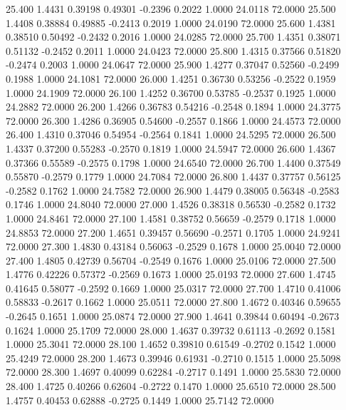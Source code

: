   25.400   1.4431   0.39198   0.49301  -0.2396   0.2022   1.0000  24.0118  72.0000
  25.500   1.4408   0.38884   0.49885  -0.2413   0.2019   1.0000  24.0190  72.0000
  25.600   1.4381   0.38510   0.50492  -0.2432   0.2016   1.0000  24.0285  72.0000
  25.700   1.4351   0.38071   0.51132  -0.2452   0.2011   1.0000  24.0423  72.0000
  25.800   1.4315   0.37566   0.51820  -0.2474   0.2003   1.0000  24.0647  72.0000
  25.900   1.4277   0.37047   0.52560  -0.2499   0.1988   1.0000  24.1081  72.0000
  26.000   1.4251   0.36730   0.53256  -0.2522   0.1959   1.0000  24.1909  72.0000
  26.100   1.4252   0.36700   0.53785  -0.2537   0.1925   1.0000  24.2882  72.0000
  26.200   1.4266   0.36783   0.54216  -0.2548   0.1894   1.0000  24.3775  72.0000
  26.300   1.4286   0.36905   0.54600  -0.2557   0.1866   1.0000  24.4573  72.0000
  26.400   1.4310   0.37046   0.54954  -0.2564   0.1841   1.0000  24.5295  72.0000
  26.500   1.4337   0.37200   0.55283  -0.2570   0.1819   1.0000  24.5947  72.0000
  26.600   1.4367   0.37366   0.55589  -0.2575   0.1798   1.0000  24.6540  72.0000
  26.700   1.4400   0.37549   0.55870  -0.2579   0.1779   1.0000  24.7084  72.0000
  26.800   1.4437   0.37757   0.56125  -0.2582   0.1762   1.0000  24.7582  72.0000
  26.900   1.4479   0.38005   0.56348  -0.2583   0.1746   1.0000  24.8040  72.0000
  27.000   1.4526   0.38318   0.56530  -0.2582   0.1732   1.0000  24.8461  72.0000
  27.100   1.4581   0.38752   0.56659  -0.2579   0.1718   1.0000  24.8853  72.0000
  27.200   1.4651   0.39457   0.56690  -0.2571   0.1705   1.0000  24.9241  72.0000
  27.300   1.4830   0.43184   0.56063  -0.2529   0.1678   1.0000  25.0040  72.0000
  27.400   1.4805   0.42739   0.56704  -0.2549   0.1676   1.0000  25.0106  72.0000
  27.500   1.4776   0.42226   0.57372  -0.2569   0.1673   1.0000  25.0193  72.0000
  27.600   1.4745   0.41645   0.58077  -0.2592   0.1669   1.0000  25.0317  72.0000
  27.700   1.4710   0.41006   0.58833  -0.2617   0.1662   1.0000  25.0511  72.0000
  27.800   1.4672   0.40346   0.59655  -0.2645   0.1651   1.0000  25.0874  72.0000
  27.900   1.4641   0.39844   0.60494  -0.2673   0.1624   1.0000  25.1709  72.0000
  28.000   1.4637   0.39732   0.61113  -0.2692   0.1581   1.0000  25.3041  72.0000
  28.100   1.4652   0.39810   0.61549  -0.2702   0.1542   1.0000  25.4249  72.0000
  28.200   1.4673   0.39946   0.61931  -0.2710   0.1515   1.0000  25.5098  72.0000
  28.300   1.4697   0.40099   0.62284  -0.2717   0.1491   1.0000  25.5830  72.0000
  28.400   1.4725   0.40266   0.62604  -0.2722   0.1470   1.0000  25.6510  72.0000
  28.500   1.4757   0.40453   0.62888  -0.2725   0.1449   1.0000  25.7142  72.0000
